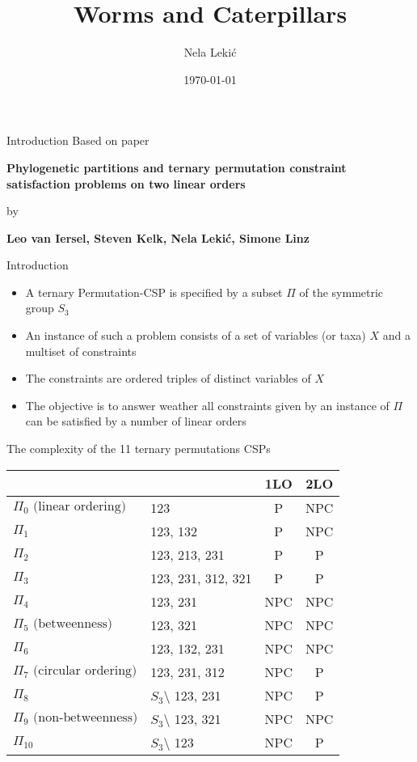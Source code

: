 \documentclass{beamer}
\title{Worms and Caterpillars}
\author{Nela Leki\'c}
\date{\today}
\begin{document}
\begin{frame}
\titlepage
\end{frame}


\begin{frame}{Introduction}
Based on paper
\begin{center}
\textbf{Phylogenetic partitions and ternary permutation constraint satisfaction problems on two linear orders}
\end{center}
by 
\begin{center}
\textbf{Leo van Iersel, Steven Kelk, Nela Leki\'c, Simone Linz}
\end{center}
\end{frame}

\begin{frame}{Introduction}
\begin{itemize}
 \item A ternary Permutation-CSP is specified by a subset $\Pi$ of the symmetric group $S_3$ 
 \item An instance of such a problem consists of a set of variables (or taxa) $X$ and a multiset of constraints
 \item The constraints are ordered triples of distinct variables of $X$
 \item The objective is to answer weather all constraints given by an instance of $\Pi$ can be satisfied by a number of linear orders
\end{itemize}
\end{frame}

\begin{frame}{The complexity of the 11 ternary permutations CSPs}
\begin{table}
\begin{center}
\begin{tabular}{l l c c}
	 &				&1LO	&2LO \\ \hline
 $\Pi_0 \text{ (linear ordering)}$ & 123 				& P 	& NPC \\
 $\Pi_1$ & 123, 132 			& P 	& NPC \\
 $\Pi_2$ & 123, 213, 231 		& P 	& P \\
 $\Pi_3$ & 123, 231, 312, 321 		& P 	& P \\
 $\Pi_4$ & 123, 231			& NPC 	& NPC \\
 $\Pi_5 \text{ (betweenness)}$ & 123, 321			& NPC 	& NPC \\
 $\Pi_6$ & 123, 132, 231		& NPC 	& NPC \\
 $\Pi_7 \text{ (circular ordering)}$ & 123, 231, 312 		& NPC 	& P \\
 $\Pi_8$ & $S_3 \setminus$ 123, 231  	& NPC 	& P \\
 $\Pi_9 \text{ (non-betweenness)} $ & $S_3 \setminus$ 123, 321  	& NPC 	& NPC \\
 $\Pi_{10}$ & $S_3 \setminus$ 123 	& NPC 	& P 
\end{tabular} 
\end{center}
\end{table} 
\end{frame}
\end{document}
